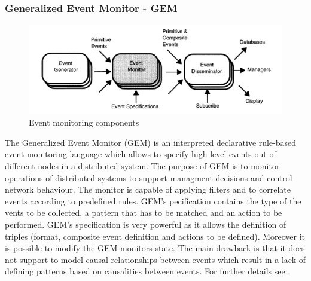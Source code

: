 \documentclass[a4paper,titlepage,11pt,DIV10,BCOR0.5cm,headinclude]{article}
\begin{document}
\subsubsection{Generalized Event Monitor - GEM}
\begin{figure} [ht]                
	\centering                                           
	\includegraphics[width=1\textwidth]{pics/GEM.jpg}
	\caption{Event monitoring components \cite{GEM95}}             
	\label{fig:gemEventMonitoringComponents}
\end{figure}  
The Generalized Event Monitor (GEM) is an interpreted declarative rule-based event monitoring language which allows to specify high-level events out of different nodes in a distributed system. The purpose of GEM is to monitor operations of distributed systems to support managment decisions and control network behaviour. The monitor is capable of applying filters and to correlate events according to predefined rules. GEM's pecification contains the type of the vents to be collected, a pattern that has to be matched and an action to be performed. GEM's specification is very powerful as it allows the definition of triples (format, composite event definition and actions to be defined). Moreover it is possible to modify the GEM monitors state. The main drawback is that it does not support to model causal relationships between events which result in a lack of defining patterns based on causalities between events. For further details see \cite{GEM95}.
\end{document}
